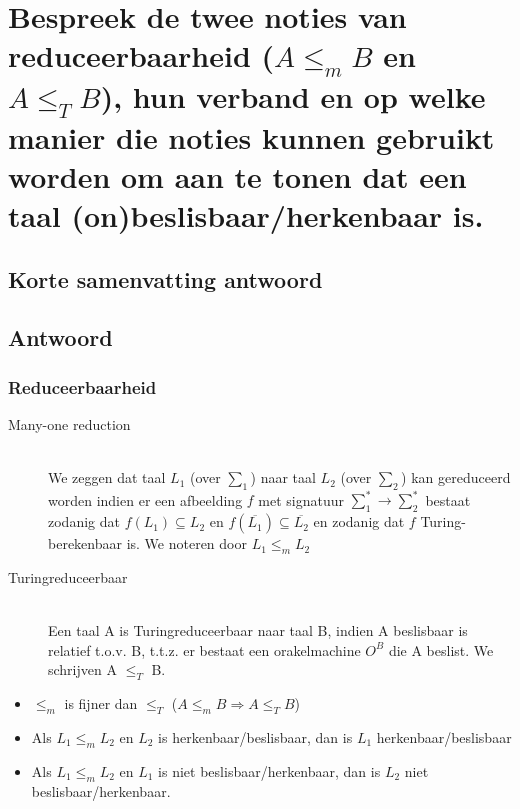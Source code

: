 \documentclass{article}
\begin{document}
\newpage
\section{Bespreek de twee noties van reduceerbaarheid ($A \leq_m B$ en $A \leq_T B$), hun verband en op welke manier die noties kunnen gebruikt worden om aan te tonen dat een taal (on)beslisbaar/herkenbaar is.}
    \subsection{Korte samenvatting antwoord}
        
    \subsection{Antwoord}
        \subsubsection{Reduceerbaarheid}
            \begin{description}
                \item[Many-one reduction] \hfill \\
                        We zeggen dat taal $L_1$ (over $\sum_1$) naar taal $L_2$ (over $\sum_2$) kan gereduceerd worden indien er een afbeelding $f$ met signatuur $\sum_1^* \rightarrow \sum_2^*$ bestaat zodanig dat $f(L_1) \subseteq L_2$ en $f(\overline{L_1}) \subseteq \overline{L_2}$ en zodanig dat $f$ Turing-berekenbaar is.
                        We noteren door $L_1 \leq_m L_2$
                \item[Turingreduceerbaar] \hfill \\
                        Een taal A is Turingreduceerbaar naar taal B, indien A beslisbaar is relatief t.o.v. B, t.t.z. er bestaat een orakelmachine $O^B$ die A beslist. We schrijven A $\leq_T$ B.
            \end{description}
            \begin{itemize}
                \item $\leq_m$ is fijner dan $\leq_T$ ($A \leq_m B \Rightarrow A \leq_T B$)
                \item Als $L_1 \leq_m L_2$ en $L_2$ is herkenbaar/beslisbaar, dan is $L_1$ herkenbaar/beslisbaar
                \item  Als $L_1 \leq_m L_2$ en $L_1$ is niet beslisbaar/herkenbaar, dan is $L_2$ niet beslisbaar/herkenbaar.
            \end{itemize}
\end{document}
